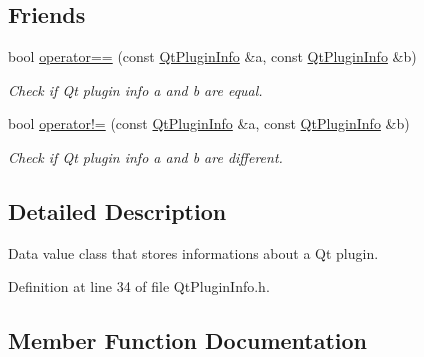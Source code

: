 \subsection*{Friends}
\begin{DoxyCompactItemize}
\item 
bool \hyperlink{class_mdt_1_1_deploy_utils_1_1_qt_plugin_info_af5e6658d0eb9149a69654915cbadfc45}{operator==} (const \hyperlink{class_mdt_1_1_deploy_utils_1_1_qt_plugin_info}{Qt\+Plugin\+Info} \&a, const \hyperlink{class_mdt_1_1_deploy_utils_1_1_qt_plugin_info}{Qt\+Plugin\+Info} \&b)\hypertarget{class_mdt_1_1_deploy_utils_1_1_qt_plugin_info_af5e6658d0eb9149a69654915cbadfc45}{}\label{class_mdt_1_1_deploy_utils_1_1_qt_plugin_info_af5e6658d0eb9149a69654915cbadfc45}

\begin{DoxyCompactList}\small\item\em Check if Qt plugin info a and b are equal. \end{DoxyCompactList}\item 
bool \hyperlink{class_mdt_1_1_deploy_utils_1_1_qt_plugin_info_afb91a6d2cf6efcab8961fceb0b858a28}{operator!=} (const \hyperlink{class_mdt_1_1_deploy_utils_1_1_qt_plugin_info}{Qt\+Plugin\+Info} \&a, const \hyperlink{class_mdt_1_1_deploy_utils_1_1_qt_plugin_info}{Qt\+Plugin\+Info} \&b)\hypertarget{class_mdt_1_1_deploy_utils_1_1_qt_plugin_info_afb91a6d2cf6efcab8961fceb0b858a28}{}\label{class_mdt_1_1_deploy_utils_1_1_qt_plugin_info_afb91a6d2cf6efcab8961fceb0b858a28}

\begin{DoxyCompactList}\small\item\em Check if Qt plugin info a and b are different. \end{DoxyCompactList}\end{DoxyCompactItemize}


\subsection{Detailed Description}
Data value class that stores informations about a Qt plugin. 

Definition at line 34 of file Qt\+Plugin\+Info.\+h.



\subsection{Member Function Documentation}
